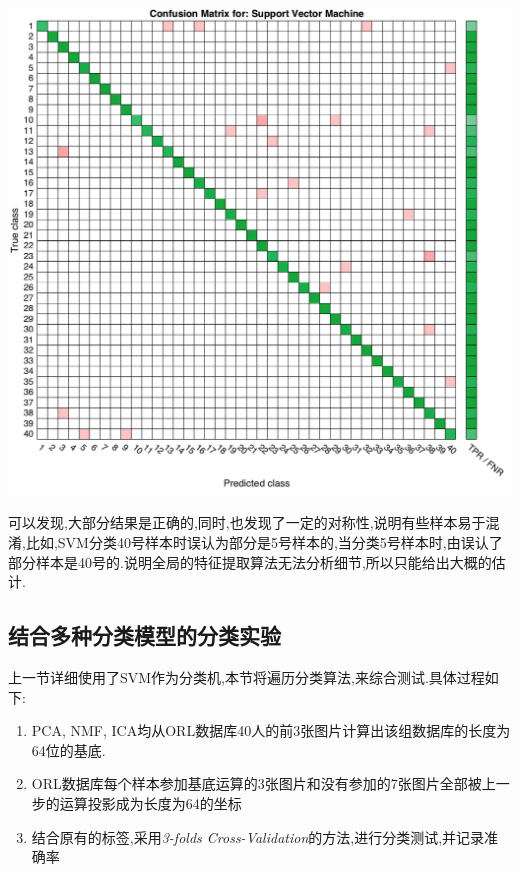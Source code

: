 	\begin{center}
	\begin{minipage}[t]{\linewidth}
	\center
	{
	\includegraphics[width=\textwidth]{Img/svm_confuse} 
	}
	\end{minipage}
	\medskip
	\end{center}
	可以发现,大部分结果是正确的,同时,也发现了一定的对称性,说明有些样本易于混淆,比如,SVM分类40号样本时误认为部分是5号样本的,当分类5号样本时,由误认了部分样本是40号的.说明全局的特征提取算法无法分析细节,所以只能给出大概的估计.
	

\subsection{结合多种分类模型的分类实验}

上一节详细使用了SVM作为分类机,本节将遍历分类算法,来综合测试.具体过程如下:
	\begin{enumerate}
		\item PCA, NMF, ICA均从ORL数据库40人的前3张图片计算出该组数据库的长度为64位的基底.
		\item ORL数据库每个样本参加基底运算的3张图片和没有参加的7张图片全部被上一步的运算投影成为长度为64的坐标
		\item 结合原有的标签,采用\textit{3-folds Cross-Validation}的方法,进行分类测试,并记录准确率
	\end{enumerate}




